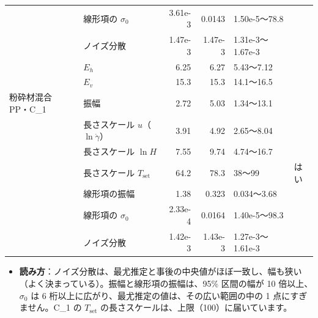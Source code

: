 \documentclass[paper=a4paper,fontsize=10.5pt,line_length=44zw,number_of_lines=38]{jlreq}
\newcommand{\gd}{\dot{\gamma}}
\newcommand{\Tset}{T_{\mathrm{set}}}
\newcommand{\Eh}{E_{h}}
\newcommand{\Ev}{E_{v}}
\newenvironment{points}{\begin{itemize}[label=$\triangleright$,leftmargin=1.5\zw,itemsep=0.3ex,topsep=0.5ex,parsep=0pt]}{\end{itemize}}
\newcommand{\pt}[1]{\item \textbf{#1}：}
\begin{document}
\begin{table}[H]
\begin{tabularx}{\linewidth}{@{}llrrXl@{}}
 & 線形項の $\sigma_0$ & 3.61e-3 & 0.0143 & 1.50e-5〜78.8 &  \\
 & ノイズ分散 & 1.47e-3 & 1.47e-3 & 1.31e-3〜1.67e-3 &  \\
 & $\Eh$ & 6.25 & 6.27 & 5.43〜7.12 &  \\
 & $\Ev$ & 15.3 & 15.3 & 14.1〜16.5 &  \\
\midrule
粉砕材混合 PP・C\_1 & 振幅 & 2.72 & 5.03 & 1.34〜13.1 &  \\
 & 長さスケール $u$（$\ln\gd$） & 3.91 & 4.92 & 2.65〜8.04 &  \\
 & 長さスケール $\ln H$ & 7.55 & 9.74 & 4.74〜16.7 &  \\
 & 長さスケール $\Tset$ & 64.2 & 78.3 & 38〜99 & はい \\
 & 線形項の振幅 & 1.38 & 0.323 & 0.034〜3.68 &  \\
 & 線形項の $\sigma_0$ & 2.33e-4 & 0.0164 & 1.40e-5〜98.3 &  \\
 & ノイズ分散 & 1.42e-3 & 1.43e-3 & 1.27e-3〜1.61e-3 &  \\

\bottomrule
\end{tabularx}
\end{table}
\begin{points}
\pt{読み方}ノイズ分散は、最尤推定と事後の中央値がほぼ一致し、幅も狭い（よく決まっている）。振幅と線形項の振幅は、95\% 区間の幅が 10 倍以上、$\sigma_0$ は 6 桁以上に広がり、最尤推定の値は、その広い範囲の中の 1 点にすぎません。C\_1 の $\Tset$ の長さスケールは、上限（100）に届いています。
\end{points}
\end{document}

